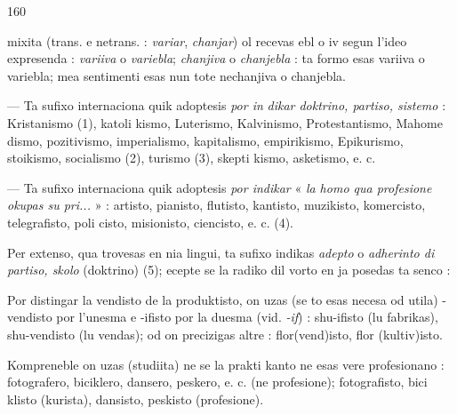 \begin{VUpage}[164]{160}

\VUcontinue
mixita (trans. e netrans. : \textit{variar}, \textit{chanjar}) ol recevas ebl\nl
o iv segun l'ideo expresenda : \textit{variiva} o \textit{variebla}; \textit{chanjiva} o\nl
\textit{chanjebla} : ta formo esas variiva o variebla; mea sentimenti\nl
esas nun tote nechanjiva o chanjebla.

 --- Ta sufixo internaciona quik adoptesis \textit{por in}\cc
\textit{dikar doktrino, partiso, sistemo} : Kristanismo (1), katoli\cc
kismo, Luterismo, Kalvinismo, Protestantismo, Mahome\cc
dismo, pozitivismo, imperialismo, kapitalismo, empirikismo,\nl
Epikurismo, stoikismo, socialismo (2), turismo (3), skepti\cc
kismo, asketismo, e. c.

 --- Ta sufixo internaciona quik adoptesis \textit{por indikar}\nl
« \textit{la homo qua profesione okupas su pri...} » : artisto, pianisto,\nl
flutisto, kantisto, muzikisto, komercisto, telegrafisto, poli\cc
cisto, misionisto, ciencisto, e. c. (4).

Per extenso, qua trovesas en nia lingui, ta sufixo indikas\nl
\textit{adepto} o \textit{adherinto di partiso, skolo} (doktrino) (5); \nl
{} ecepte se la radiko dil vorto\nl
en  ja posedas ta senco : \nl
{}

Por distingar la vendisto de la produktisto, on uzas (se\nl
to esas necesa od utila) -vendisto por l'unesma e -ifisto por\nl
la duesma (vid. \textit{-if}) : shu-ifisto (lu fabrikas), shu-vendisto\nl
(lu vendas); od on precizigas altre : flor(vend)isto, flor\cc
(kultiv)isto.

Kompreneble on uzas  (studiita) ne  se la prakti\cc
kanto ne esas vere profesionano : fotografero, biciklero,\nl
dansero, peskero, e. c. (ne profesione); fotografisto, bici\cc
klisto (kurista), dansisto, peskisto (profesione).
\end{VUpage}

